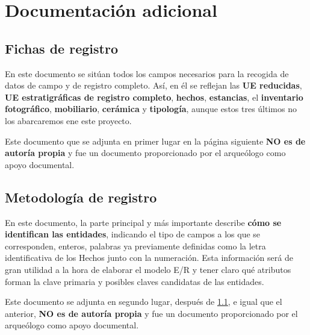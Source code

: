 \chapter{Documentación adicional}
\section{Fichas de registro} \label{sec:registrationforms}
En este documento se sitúan todos los campos necesarios para la recogida de datos de campo
y de registro completo. Así, en él se reflejan las \textbf{UE reducidas}, \textbf{UE
estratigráficas de registro completo},  \textbf{hechos}, \textbf{estancias}, el
\textbf{inventario fotográfico}, \textbf{mobiliario}, \textbf{cerámica} y \textbf{tipología},
aunque estos tres últimos no los abarcaremos ene este proyecto.

Este documento que se adjunta en primer lugar en la página siguiente \textbf{NO es de
autoría propia} y fue un documento proporcionado por el arqueólogo como apoyo documental.

\section{Metodología de registro}
En este documento, la parte principal y más importante describe \textbf{cómo se identifican
las entidades}, indicando el tipo de campos a los que se corresponden, enteros, palabras ya
previamente definidas como la letra identificativa de los Hechos junto con la numeración. Esta
información será de gran utilidad a la hora de elaborar el modelo E/R y tener claro qué
atributos forman la clave primaria y posibles claves candidatas de las entidades.

Este documento se adjunta en segundo lugar, después de \ref{sec:registrationforms}, e
igual que el anterior, \textbf{NO es de autoría propia} y fue un documento proporcionado por
el arqueólogo como apoyo documental.




